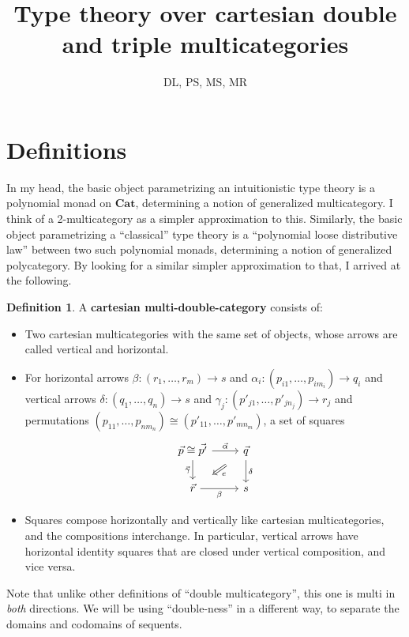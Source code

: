 \documentclass{article}
\title{Type theory over cartesian double and triple multicategories}
\author{DL, PS, MS, MR}
\theoremstyle{definition}
\newtheorem{defn}{Definition}
\def\twocell#1#2#3{\ar[from=#1,to=#2,phantom,""{name=1,near start},""{name=2,near end}]\ar[Rightarrow,from=1,to=2,"#3"]}
\def\drtwocell{\twocell{r}{d}}
\begin{document}
\maketitle

\section{Definitions}
\label{sec:definitions}

In my head, the basic object parametrizing an intuitionistic type theory is a polynomial monad on $\mathbf{Cat}$, determining a notion of generalized multicategory.
I think of a 2-multicategory as a simpler approximation to this.
Similarly, the basic object parametrizing a ``classical'' type theory is a ``polynomial loose distributive law'' between two such polynomial monads, determining a notion of generalized polycategory.
By looking for a similar simpler approximation to that, I arrived at the following.

\begin{defn}
  A \textbf{cartesian multi-double-category} consists of:
  \begin{itemize}
  \item Two cartesian multicategories with the same set of objects, whose arrows are called vertical and horizontal.
  \item For horizontal arrows $\beta:(r_1,\dots,r_m)\to s$ and $\alpha_i:(p_{i1},\dots,p_{im_i})\to q_i$ and vertical arrows $\delta:(q_1,\dots,q_n) \to s$ and $\gamma_j:(p'_{j1},\dots,p'_{j n_j})\to r_j$ and permutations $(p_{11},\dots,p_{nm_n})\cong (p'_{11},\dots,p'_{mn_m})$, a set of squares
    \[\begin{tikzcd}
      \vec{p}\cong\vec{p'} \ar[r,"\vec{\alpha}"] \ar[d,swap,"\vec{\gamma}"]\drtwocell{e}
      & \vec{q} \ar[d,"\delta"]
      \\ \vec{r} \ar[r,swap,"\beta"] & s
    \end{tikzcd}\]
  \item Squares compose horizontally and vertically like cartesian multicategories, and the compositions interchange.
    In particular, vertical arrows have horizontal identity squares that are closed under vertical composition, and vice versa.
  \end{itemize}
\end{defn}

Note that unlike other definitions of ``double multicategory'', this one is multi in \emph{both} directions.
We will be using ``double-ness'' in a different way, to separate the domains and codomains of sequents.
\end{document}
